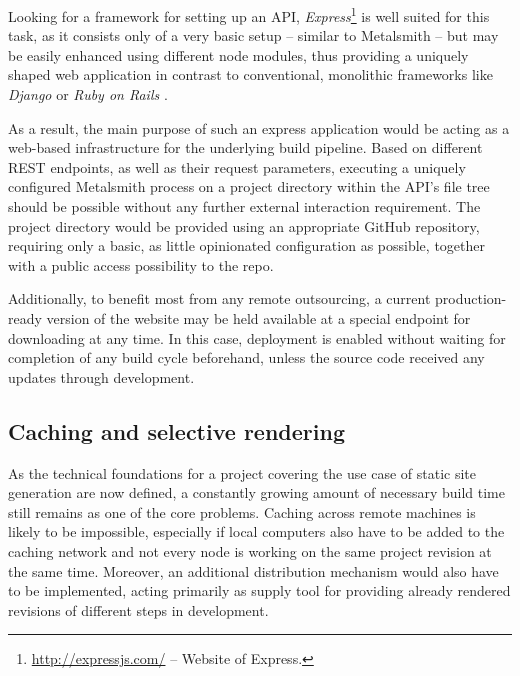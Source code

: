 Looking for a framework for setting up an API, \emph{Express}\footnote{\url{http://expressjs.com/} -- Website of Express.} is well suited for this task, as it consists only of a very basic setup -- similar to Metalsmith -- but may be easily enhanced using different node modules, thus providing a uniquely shaped web application in contrast to conventional, monolithic frameworks like \emph{Django} or \emph{Ruby on Rails} \cite[176]{cantelon2017node}.



As a result, the main purpose of such an express application would be acting as a web-based infrastructure for the underlying build pipeline. Based on different REST endpoints, as well as their request parameters, executing a uniquely configured Metalsmith process on a project directory within the API's file tree should be possible without any further external interaction requirement. The project directory would be provided using an appropriate GitHub repository, requiring only a basic, as little opinionated configuration as possible, together with a public access possibility to the repo.

Additionally, to benefit most from any remote outsourcing, a current production-ready version of the website may be held available at a special endpoint for downloading at any time. In this case, deployment is enabled without waiting for completion of any build cycle beforehand, unless the source code received any updates through development.


\subsection{Caching and selective rendering}
\label{sec:primarythoughts-rendering}

As the technical foundations for a project covering the use case of static site generation are now defined, a constantly growing amount of necessary build time still remains as one of the core problems. Caching across remote machines is likely to be impossible, especially if local computers also have to be added to the caching network and not every node is working on the same project revision at the same time. Moreover, an additional distribution mechanism would also have to be implemented, acting primarily as supply tool for providing already rendered revisions of different steps in development.


